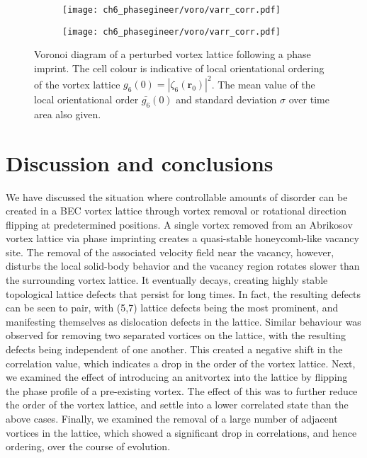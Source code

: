 \begin{figure}\ContinuedFloat\centering
    \begin{subfigure}{0.6\textwidth}
        \texttt{[image: ch6\_phasegineer/voro/varr\_corr.pdf]}
    \end{subfigure}
    \begin{subfigure}{0.6\textwidth}
        \texttt{[image: ch6\_phasegineer/voro/varr\_corr.pdf]}
    \end{subfigure}
    \caption{Voronoi diagram of a perturbed vortex lattice following a phase imprint. The cell colour is indicative of local orientational ordering of the vortex lattice $g_6(0) = |\zeta_6(\mathbf{r}_0)|^2$. The mean value of the local orientational order $\bar{g_6}(0)$ and standard deviation $\sigma$ over time area also given.}
\end{figure}

\section{Discussion and conclusions}\label{sec:ch6_conc}

We have discussed the situation where controllable amounts of disorder can be created in a BEC vortex lattice through vortex removal or rotational direction flipping at predetermined positions. A single vortex removed from an Abrikosov vortex lattice via phase imprinting creates a quasi-stable honeycomb-like vacancy site. The removal of the associated velocity field near the vacancy, however, disturbs the local solid-body behavior and the vacancy region rotates slower than the surrounding vortex lattice. It eventually decays, creating highly stable topological lattice defects that persist for long times. In fact, the resulting defects can be seen to pair, with (5,7) lattice defects being the most prominent, and manifesting themselves as dislocation defects in the lattice. Similar behaviour was observed for removing two separated vortices on the lattice, with the resulting defects being independent of one another. This created a negative shift in the correlation value, which indicates a drop in the order of the vortex lattice. Next, we examined the effect of introducing an anitvortex into the lattice by flipping the phase profile of a pre-existing vortex. The effect of this was to further reduce the order of the vortex lattice, and settle into a lower correlated state than the above cases. Finally, we examined the removal of a large number of adjacent vortices in the lattice, which showed a significant drop in correlations, and hence ordering, over the course of evolution.

